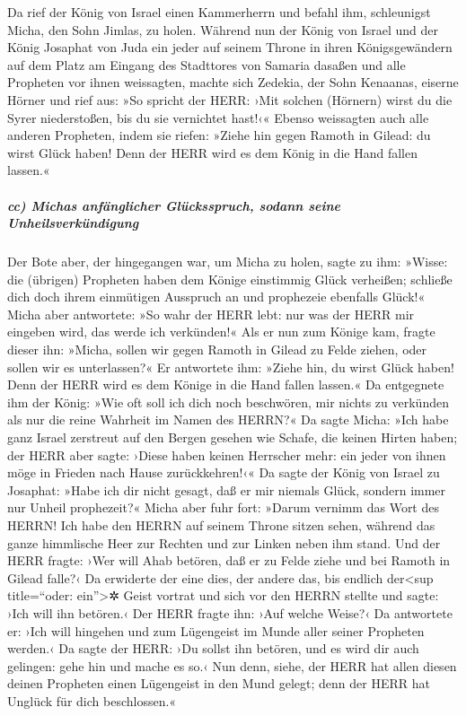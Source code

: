 Da rief der König von Israel einen Kammerherrn und befahl
ihm, schleunigst Micha, den Sohn Jimlas, zu holen.
Während nun der König von Israel und der König Josaphat
von Juda ein jeder auf seinem Throne in ihren Königsgewändern auf dem
Platz am Eingang des Stadttores von Samaria dasaßen und alle Propheten
vor ihnen weissagten, machte sich Zedekia, der Sohn
Kenaanas, eiserne Hörner und rief aus: »So spricht der HERR: ›Mit
solchen (Hörnern) wirst du die Syrer niederstoßen, bis du sie vernichtet
hast!‹« Ebenso weissagten auch alle anderen Propheten,
indem sie riefen: »Ziehe hin gegen Ramoth in Gilead: du wirst Glück
haben! Denn der HERR wird es dem König in die Hand fallen lassen.«

\hypertarget{cc-michas-anfuxe4nglicher-gluxfccksspruch-sodann-seine-unheilsverkuxfcndigung}{%
\subparagraph{cc) Michas anfänglicher Glücksspruch, sodann seine
Unheilsverkündigung}\label{cc-michas-anfuxe4nglicher-gluxfccksspruch-sodann-seine-unheilsverkuxfcndigung}}

Der Bote aber, der hingegangen war, um Micha zu holen,
sagte zu ihm: »Wisse: die (übrigen) Propheten haben dem Könige
einstimmig Glück verheißen; schließe dich doch ihrem einmütigen
Ausspruch an und prophezeie ebenfalls Glück!« Micha aber
antwortete: »So wahr der HERR lebt: nur was der HERR mir eingeben wird,
das werde ich verkünden!« Als er nun zum Könige kam,
fragte dieser ihn: »Micha, sollen wir gegen Ramoth in Gilead zu Felde
ziehen, oder sollen wir es unterlassen?« Er antwortete ihm: »Ziehe hin,
du wirst Glück haben! Denn der HERR wird es dem Könige in die Hand
fallen lassen.« Da entgegnete ihm der König: »Wie oft
soll ich dich noch beschwören, mir nichts zu verkünden als nur die reine
Wahrheit im Namen des HERRN?« Da sagte Micha: »Ich habe
ganz Israel zerstreut auf den Bergen gesehen wie Schafe, die keinen
Hirten haben; der HERR aber sagte: ›Diese haben keinen Herrscher mehr:
ein jeder von ihnen möge in Frieden nach Hause zurückkehren!‹«
Da sagte der König von Israel zu Josaphat: »Habe ich dir
nicht gesagt, daß er mir niemals Glück, sondern immer nur Unheil
prophezeit?« Micha aber fuhr fort: »Darum vernimm das
Wort des HERRN! Ich habe den HERRN auf seinem Throne sitzen sehen,
während das ganze himmlische Heer zur Rechten und zur Linken neben ihm
stand. Und der HERR fragte: ›Wer will Ahab betören, daß
er zu Felde ziehe und bei Ramoth in Gilead falle?‹ Da erwiderte der eine
dies, der andere das, bis endlich der\textless sup
title=``oder: ein''\textgreater✲ Geist vortrat und sich vor den HERRN
stellte und sagte: ›Ich will ihn betören.‹ Der HERR fragte ihn: ›Auf
welche Weise?‹ Da antwortete er: ›Ich will hingehen und
zum Lügengeist im Munde aller seiner Propheten werden.‹ Da sagte der
HERR: ›Du sollst ihn betören, und es wird dir auch gelingen: gehe hin
und mache es so.‹ Nun denn, siehe, der HERR hat allen
diesen deinen Propheten einen Lügengeist in den Mund gelegt; denn der
HERR hat Unglück für dich beschlossen.«

